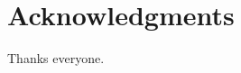 \documentclass[10pt,letterpaper]{article}
\begin{document}
\section*{Acknowledgments}
Thanks everyone.


\nolinenumbers

%
%
% 
 



\end{document}
